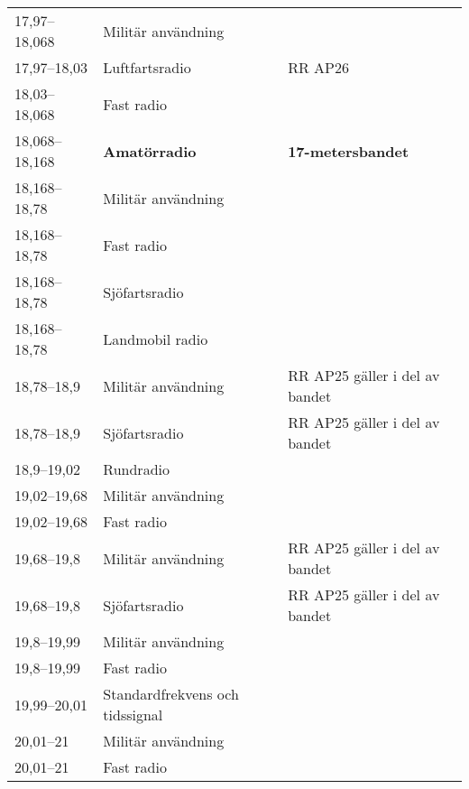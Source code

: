 \begin{landscape}
\begin{longtable}{lll}
17,97--18,068     & Militär användning               &                                 \\
17,97--18,03      & Luftfartsradio                   & RR AP26                         \\
18,03--18,068     & Fast radio                       &                                 \\
18,068--18,168    & \textbf{Amatörradio}             & \textbf{17-metersbandet}        \\
18,168--18,78     & Militär användning               &                                 \\
18,168--18,78     & Fast radio                       &                                 \\
18,168--18,78     & Sjöfartsradio                    &                                 \\
18,168--18,78     & Landmobil radio                  &                                 \\
18,78--18,9       & Militär användning               & RR AP25 gäller i del av bandet  \\
18,78--18,9       & Sjöfartsradio                    & RR AP25 gäller i del av bandet  \\
18,9--19,02       & Rundradio                        &                                 \\
19,02--19,68      & Militär användning               &                                 \\
19,02--19,68      & Fast radio                       &                                 \\
19,68--19,8       & Militär användning               & RR AP25 gäller i del av bandet  \\
19,68--19,8       & Sjöfartsradio                    & RR AP25 gäller i del av bandet  \\
19,8--19,99       & Militär användning               &                                 \\
19,8--19,99       & Fast radio                       &                                 \\
19,99--20,01      & Standardfrekvens och tidssignal  &                                 \\
20,01--21         & Militär användning               &                                 \\
20,01--21         & Fast radio                       &                                 \\

\end{longtable}
\end{landscape}
